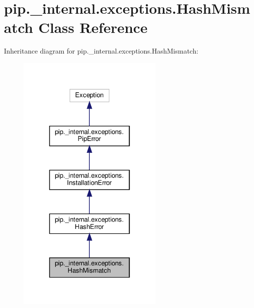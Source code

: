 \hypertarget{classpip_1_1__internal_1_1exceptions_1_1HashMismatch}{}\section{pip.\+\_\+internal.\+exceptions.\+Hash\+Mismatch Class Reference}
\label{classpip_1_1__internal_1_1exceptions_1_1HashMismatch}


Inheritance diagram for pip.\+\_\+internal.\+exceptions.\+Hash\+Mismatch\+:
\nopagebreak
\begin{figure}[H]
\begin{center}
\leavevmode
\includegraphics[width=202pt]{classpip_1_1__internal_1_1exceptions_1_1HashMismatch__inherit__graph}
\end{center}
\end{figure}


